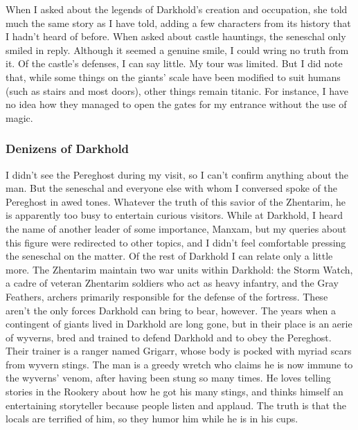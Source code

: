 \documentclass[10pt,a4paper,twoside,twocolumn,openany,bg=print,nodeprecatedcode]{dndbook}
\begin{document}
When I asked about the legends of Darkhold's creation and occupation, she told much the same story as I have told, adding a few characters from its history that I hadn't heard of before. When asked about castle hauntings, the seneschal only smiled in reply. Although it seemed a genuine smile, I could wring no truth from it.
Of the castle's defenses, I can say little. My tour was limited. But I did note that, while some things on the giants' scale have been modified to suit humans (such as stairs and most doors), other things remain titanic. For instance, I have no idea how they managed to open the gates for my entrance without the use of magic.
\subsubsection{Denizens of Darkhold}
I didn't see the Pereghost during my visit, so I can't confirm anything about the man. But the seneschal and everyone else with whom I conversed spoke of the Pereghost in awed tones. Whatever the truth of this savior of the Zhentarim, he is apparently too busy to entertain curious visitors. While at Darkhold, I heard the name of another leader of some importance, Manxam, but my queries about this figure were redirected to other topics, and I didn't feel comfortable pressing the seneschal on the matter.
Of the rest of Darkhold I can relate only a little more. The Zhentarim maintain two war units within Darkhold: the Storm Watch, a cadre of veteran Zhentarim soldiers who act as heavy infantry, and the Gray Feathers, archers primarily responsible for the defense of the fortress.
These aren't the only forces Darkhold can bring to bear, however. The years when a contingent of giants lived in Darkhold are long gone, but in their place is an aerie of wyverns, bred and trained to defend Darkhold and to obey the Pereghost. Their trainer is a ranger named Grigarr, whose body is pocked with myriad scars from wyvern stings. The man is a greedy wretch who claims he is now immune to the wyverns' venom, after having been stung so many times. He loves telling stories in the Rookery about how he got his many stings, and thinks himself an entertaining storyteller because people listen and applaud. The truth is that the locals are terrified of him, so they humor him while he is in his cups.
\end{document}
